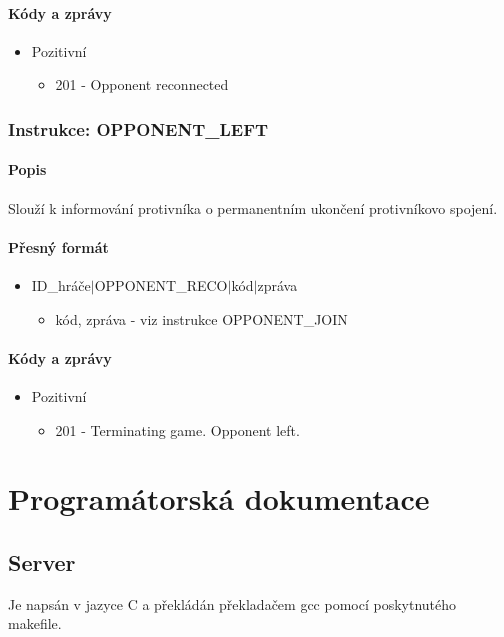 \documentclass[12pt]{report}
\begin{document}
\subsubsection{Kódy a zprávy}
\begin{itemize}
	\item Pozitivní
		\begin{itemize}
			\item 201 - Opponent reconnected
		\end{itemize}
\end{itemize}
%
%
%
\subsection{Instrukce: OPPONENT\_LEFT}
\subsubsection{Popis}
Slouží k informování protivníka o permanentním ukončení protivníkovo spojení.

\subsubsection{Přesný formát}
\begin{itemize}
	\item ID\_hráče$|$OPPONENT\_RECO$|$kód$|$zpráva
		\begin{itemize}
				\item kód, zpráva - viz instrukce OPPONENT\_JOIN
		\end{itemize}
\end{itemize}

\subsubsection{Kódy a zprávy}
\begin{itemize}
	\item Pozitivní
		\begin{itemize}
			\item 201 - Terminating game. Opponent left.
			\end{itemize}
\end{itemize}

%
\chapter{Programátorská dokumentace}
\section{Server}
Je napsán v jazyce C a překládán překladačem gcc pomocí poskytnutého makefile.
\end{document}

